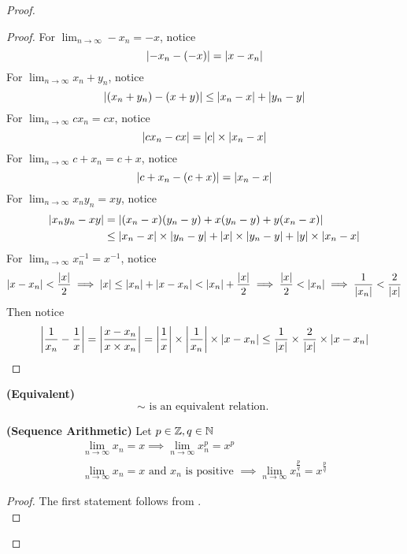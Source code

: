 \documentclass{report}
\begin{document}
\begin{proof}
\begin{proof}
For $\lim_{n\to\infty}-x_n=-x$, notice
\begin{equation}
  \left|-x_n-(-x)\right|=\left|x-x_n\right|
\end{equation}
For $\lim_{n\to\infty}x_n+y_n$, notice
\begin{equation}
\left|(x_n+y_n)-(x+y)\right|\leq \left|x_n-x\right|+\left|y_n-y\right|
\end{equation}
For $\lim_{n\to\infty} cx_n=cx$, notice
\begin{equation}
\left|cx_n-cx\right|=\left|c\right|\times\left|x_n-x\right|
\end{equation}
For $\lim_{n\to\infty} c+x_n=c+x$, notice
\begin{equation}
\left|c+x_n-(c+x)\right|=\left|x_n-x\right|
\end{equation}
For $\lim_{n\to\infty} x_ny_n=xy$, notice
\begin{align}
  \left|x_ny_n-xy\right|&=\left|(x_n-x)(y_n-y)+x(y_n-y)+y(x_n-x)\right|\\
  &\leq \left|x_n-x\right|\times\left|y_n-y\right|+\left|x\right|\times\left|y_n-y\right|+\left|y\right|\times\left|x_n-x\right|
\end{align}
For $\lim_{n\to\infty}x_n^{-1}=x^{-1}$, notice 
\begin{equation}
\left|x-x_n\right|<\frac{\left|x\right|}{2}\implies \left|x\right|\leq \left|x_n\right|+\left|x-x_n\right|<\left|x_n\right|+\frac{\left|x\right|}{2}\implies \frac{\left|x\right|}{2}<\left|x_n\right|\implies \frac{1}{\left|x_n\right|}<\frac{2}{\left|x\right|}
\end{equation}
Then notice
\begin{equation}
\left|\frac{1}{x_n}-\frac{1}{x}\right|=\left|\frac{x-x_n}{x\times x_n}\right|=\left|\frac{1}{x}\right|\times \left|\frac{1}{x_n}\right|\times \left|x-x_n\right|\leq \frac{1}{\left|x\right|}\times \frac{2}{\left|x\right|}\times \left|x-x_n\right|
\end{equation}
\end{proof}
\begin{corollary}
\label{2.1.7}
\textbf{(Equivalent)} 
\begin{equation}
\sim\text{ is an equivalent relation. }
\end{equation}
\end{corollary}
\begin{corollary}
\label{2.1.8}
\textbf{(Sequence Arithmetic)} Let $p\in\mathbb{Z},q\in\mathbb{N}$
\begin{gather}
\lim_{n\to\infty} x_n=x\implies \lim_{n\to\infty} x_n^p=x^p\\
\lim_{n\to\infty} x_n=x\text{ and }x_n\text{ is positive }\implies \lim_{n\to\infty} x_n^{\frac{p}{q}}=x^{\frac{p}{q}}
\end{gather}
\end{corollary}
\begin{proof}
The first statement follows from .\\


\end{proof}
\end{proof}
\end{document}
